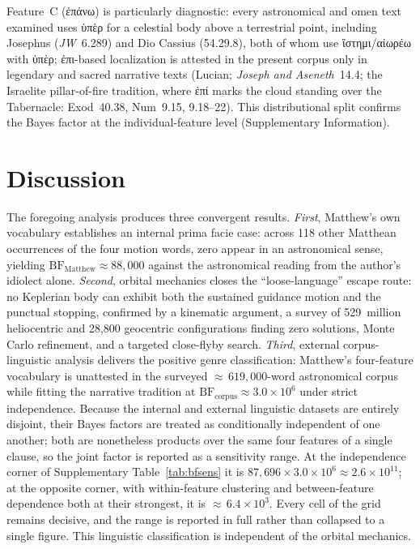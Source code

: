 \documentclass[sn-nature]{sn-jnl}
\newcommand{\grk}[1]{{\fontencoding{LGR}\selectfont #1}}
\newcommand{\grk}[1]{{\greekfont #1}}
\begin{document}
Feature~C (\grk{ἐπάνω}) is particularly diagnostic: every astronomical and
omen text examined uses \grk{ὑπὲρ} for a celestial body above a terrestrial
point, including Josephus (\textit{JW}~6.289) and Dio Cassius (54.29.8),
both of whom use \grk{ἵστημι}/\grk{αἰωρέω} with \grk{ὑπὲρ};
\grk{ἐπι}-based localization is attested in the present corpus only in
legendary and sacred narrative texts (Lucian; \textit{Joseph and Aseneth}~14.4;
the Israelite pillar-of-fire tradition, where \grk{ἐπί} marks the cloud
standing over the Tabernacle: Exod~40.38, Num~9.15, 9.18--22). This
distributional split confirms the Bayes factor at the individual-feature level
(Supplementary Information).

\section{Discussion}\label{sec:discussion}

The foregoing analysis produces three convergent results.
\textit{First}, Matthew's own vocabulary establishes an internal prima facie
case: across 118 other Matthean occurrences of the four motion words, zero
appear in an astronomical sense, yielding $\mathrm{BF}_\text{Matthew} \approx
88{,}000$ against the astronomical reading from the author's idiolect alone.
\textit{Second}, orbital mechanics closes the ``loose-language'' escape route:
no Keplerian body can exhibit both the sustained guidance motion and the
punctual stopping, confirmed by a kinematic argument, a survey of
529~million heliocentric and 28,800 geocentric configurations finding zero
solutions, Monte Carlo refinement, and a targeted close-flyby search.
\textit{Third}, external corpus-linguistic analysis delivers the positive
genre classification: Matthew's four-feature vocabulary is unattested in
the surveyed ${\approx}\,619{,}000$-word astronomical corpus while fitting the
narrative tradition at $\mathrm{BF}_\text{corpus} \approx 3.0\times10^{6}$
under strict independence. Because the internal and external linguistic
datasets are entirely disjoint, their Bayes factors are treated as
conditionally independent of one another; both are nonetheless products over
the same four features of a single clause, so the joint factor is reported as
a sensitivity range. At the independence corner of Supplementary
Table~\ref{tab:bfsens} it is $87{,}696 \times 3.0\times10^{6} \approx
2.6\times10^{11}$; at the opposite corner, with within-feature clustering and
between-feature dependence both at their strongest, it is
${\approx}\,6.4\times10^{3}$. Every cell of the grid remains decisive, and
the range is reported in full rather than collapsed to a single figure.
This linguistic classification is independent of the orbital mechanics.
\end{document}
